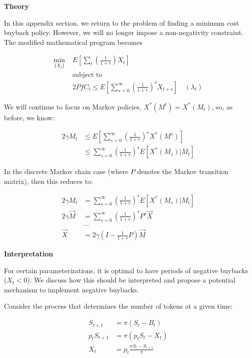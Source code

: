 
\textbf{Theory}

In this appendix section, we return to the problem of finding a minimum cost buyback policy.
However, we will no longer impose a non-negativity constraint. The modified mathematical program
becomes

\begin{align*}
  \min_{\{X_t\}} \; & E \left[ \sum_{t} \left(\frac{1}{1 + r} \right) X_t \right] \\
  &\text{subject to} \\
  \quad & 2 PfC_t \leq E \left[ \sum_{s=0}^{\infty} \left(\frac{1}{1 + r}\right)^s X_{t+s} \right] \quad (\lambda_t)
\end{align*}

We will continue to focus on Markov policies, $X^*(M^t) = X^*(M_t)$, so, as before, we know:

\begin{align*}
  2 \gamma M_t &\leq E \left[ \sum_{s=0}^{\infty} \left( \frac{1}{1+r} \right)^s X^*(M^s) \right] \\
  &\leq \sum_{s=0}^{\infty} \left( \frac{1}{1+r} \right)^s E \left[X^*(M_s) | M_t \right]
\end{align*}

In the discrete Markov chain case (where $P$ denotes the Markov transition matrix), then this
reduces to:

\begin{align*}
  2 \gamma M_t &= \sum_{s=0}^{\infty} \left( \frac{1}{1+r} \right)^s E \left[X^*(M_s) | M_t \right] \\
  2 \gamma \vec{M} &= \sum_{s=0}^{\infty} \left( \frac{1}{1+r} \right)^s P^s \vec{X} \\
  &\dots \\
  \vec{X} &= 2 \gamma \left(I - \frac{1}{1 + r} P \right) \vec{M}
\end{align*}

\textbf{Interpretation}

For certain parameterizations, it is optimal to have periods of negative buybacks ($X_t < 0$). We
discuss how this should be interpreted and propose a potential mechanism to implement negative
buybacks.

Consider the process that determines the number of tokens at a given time:

\begin{align*}
  S_{t+1} &= \pi (S_t - B_t) \\
  p_t S_{t+1} &= \pi (p_t S_t - X_t) \\
  X_t &= p_t \frac{\pi S_t - S_{t+1}}{\pi}
\end{align*}

